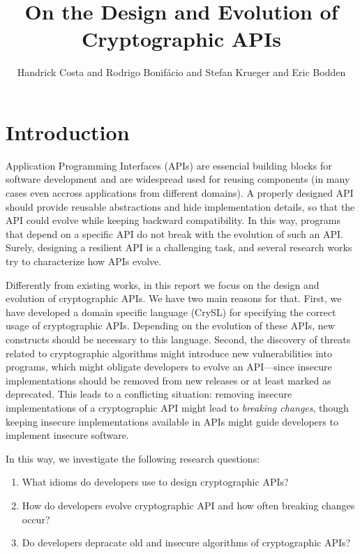 \documentclass{article}
\author{Handrick Costa and Rodrigo Bonif\'{a}cio and Stefan Krueger and Eric Bodden}
\title{On the Design and Evolution of Cryptographic APIs}
\newcommand{\report}{report\xspace}
\begin{document}
\maketitle

\begin{abstract}

\end{abstract}

\section{Introduction}


Application Programming Interfaces (APIs) are essencial
building blocks for software development and are widespread
used for reusing components (in many cases even accross applications
from different domains). A properly designed API should provide reusable
abstractions and hide implementation details, so that the API could
evolve while keeping backward compatibility. In this way, 
programs that depend on a specific API do not break
with the evolution of such an API. Surely, designing a
resilient API is a challenging task, and several research works
try to characterize how APIs evolve.   

Differently from existing works, in this \report we focus on
the design and evolution of cryptographic APIs. We have two
main reasons for that. First, we have developed a domain specific
language (CrySL) for specifying the correct usage of cryptographic APIs.
Depending on the evolution of these APIs, new constructs should
be necessary to this language. Second, the discovery of
threats related to cryptographic algorithms might
introduce new vulnerabilities into programs, which might obligate
developers to evolve an API---since insecure implementations
should be removed from new releases or at least marked as deprecated.
This leads to a conflicting situation:
removing insecure implementations of
a cryptographic API might lead to \emph{breaking changes}, though
keeping insecure implementations available in APIs
might guide developers to implement insecure software.


In this way, we investigate the following research
questions:

\begin{enumerate}[(RQ1)]
\item What idioms do developers use to design cryptographic APIs?

\item How do developers evolve cryptographic API and how often breaking changes occur?
  
\item Do developers depracate old and insecure algorithms of cryptographic APIs? 
\end{enumerate}  
\end{document}
